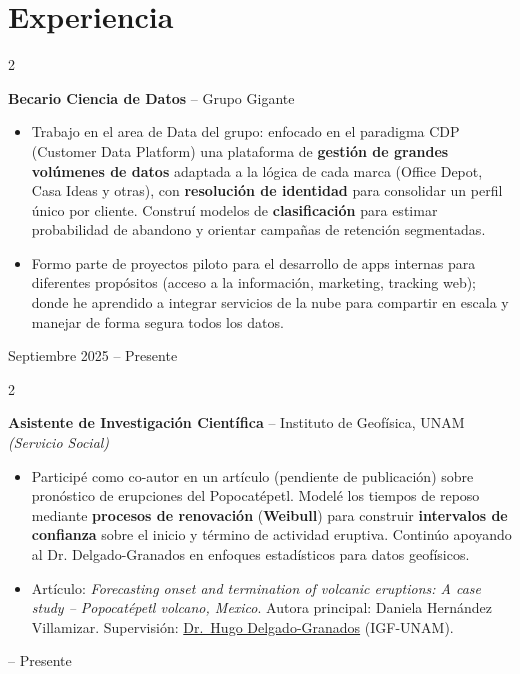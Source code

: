 \documentclass[10pt, letterpaper]{article}
\newenvironment{highlights}{
    \begin{itemize}[
        topsep=0.10 cm,
        parsep=0.10 cm,
        partopsep=0pt,
        itemsep=0pt,
        leftmargin=0.4 cm + 10pt
    ]
}{
    \end{itemize}
} %
\newenvironment{twocolentry}[2][]{
    \onecolentry
    \def\secondColumn{#2}
    \setcolumnwidth{\fill, 4.5 cm}
    \begin{paracol}{2}
}{
    \switchcolumn \raggedleft \secondColumn
    \end{paracol}
    \endonecolentry
} %
\let\hrefWithoutArrow\href
\renewcommand{\href}[2]{\hrefWithoutArrow{#1}{\ifthenelse{\equal{#2}{}}{ }{#2 }\raisebox{.15ex}{\footnotesize \faExternalLink*}}}
\begin{document}
    \section{Experiencia}

        \begin{twocolentry}{
            Septiembre 2025 -- Presente
        }
            \textbf{Becario Ciencia de Datos} -- Grupo Gigante
            \begin{highlights}
                \item Trabajo en el area de Data del grupo: enfocado en el paradigma CDP (Customer Data Platform) una plataforma de \textbf{gestión de grandes volúmenes de datos} adaptada a la lógica de cada marca (Office Depot, Casa Ideas y otras), con \textbf{resolución de identidad} para consolidar un perfil único por cliente. Construí modelos de \textbf{clasificación} para estimar probabilidad de abandono y orientar campañas de retención segmentadas.
                \item Formo parte de proyectos piloto para el desarrollo de apps internas para diferentes propósitos (acceso a la información, marketing, tracking web); donde he aprendido a integrar servicios de la nube para compartir en escala y manejar de forma segura todos los datos.
            \end{highlights}
        \end{twocolentry}

        \vspace{0.2 cm}

        \begin{twocolentry}{
            2025 -- Presente
        }
            \textbf{Asistente de Investigación Científica} -- Instituto de Geofísica, UNAM \textit{(Servicio Social)}
            \begin{highlights}
                \item Participé como co-autor en un artículo (pendiente de publicación) sobre pronóstico de erupciones del Popocatépetl. Modelé los tiempos de reposo mediante \textbf{procesos de renovación} (\textbf{Weibull}) para construir \textbf{intervalos de confianza} sobre el inicio y término de actividad eruptiva. Continúo apoyando al Dr. Delgado-Granados en enfoques estadísticos para datos geofísicos.
                \item Artículo: \textit{Forecasting onset and termination of volcanic eruptions: A case study -- Popocatépetl volcano, Mexico}. Autora principal: Daniela Hernández Villamizar. Supervisión: \hrefWithoutArrow{https://scholar.google.com/citations?user=lDD0DZQAAAAJ}{Dr.\ Hugo Delgado-Granados} (IGF-UNAM).
            \end{highlights}
        \end{twocolentry}
\end{document}
